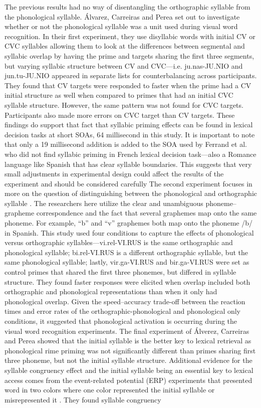 \documentclass[
12pt, %
english, %
doublespacing, %
nolistspacing, %
liststotoc, %
headsepline, %
chapterinoneline, %
openany, %
]{DoctoralThesis}\usepackage[]{graphicx}\usepackage[]{color}
\begin{document}
The previous results had no way of disentangling the orthographic syllable from the phonological syllable. Álvarez, Carreiras and Perea \parencite*{Alvarez2004-nd} set out to investigate whether or not the phonological syllable was a unit used during visual word recognition. In their first experiment, they use disyllabic words with initial CV or CVC syllables allowing them to look at the differences between segmental and syllabic overlap by having the prime and targets sharing the first three segments, but varying syllabic structure between CV and CVC—i.e. ju.nas-JU.NIO and jun.tu-JU.NIO appeared in separate lists for counterbalancing across participants. They found that CV targets were responded to faster when the prime had a CV initial structure as well when compared to primes that had an initial CVC syllable structure. However, the same pattern was not found for CVC targets. Participants also made more errors on CVC target than CV targets. These findings do support that fact that syllabic priming effects can be found in lexical decision tasks at short SOAs, 64 millisecond in this study. It is important to note that only a 19 millisecond addition is added to the SOA used by Ferrand et al. \parencite*{Ferrand1996-vu} who did not find syllabic priming in French lexical decision task—also a Romance language like Spanish that has clear syllable boundaries. This suggests that very small adjustments in experimental design could affect the results of the experiment and should be considered carefully The second experiment focuses in more on the question of distinguishing between the phonological and orthographic syllable \parencite{Alvarez2004-nd}. The researchers here utilize the clear and unambiguous phoneme–grapheme correspondence and the fact that several graphemes map onto the same phoneme. For example, “b” and “v” graphemes both map onto the phoneme /b/ in Spanish. This study used four conditions to capture the effects of phonological versus orthographic syllables—vi.rel-VI.RUS is the same orthographic and phonological syllable; bi.rel-VI.RUS is a different orthographic syllable, but the same phonological syllable; lastly, vir.ga-VI.RUS and bir.ga-VI.RUS were set as control primes that shared the first three phonemes, but differed in syllable structure. They found faster responses were elicited when overlap included both orthographic and phonological representations than when it only had phonological overlap. Given the speed–accuracy trade-off between the reaction times and error rates of the orthographic-phonological and phonological only conditions, it suggested that phonological activation is occurring during the visual word recognition experiments. The final experiment of Álverez, Carreiras and Perea \parencite*{Alvarez2004-nd} showed that the initial syllable is the better key to lexical retrieval as phonological rime priming was not significantly different than primes sharing first three phoneme, but not the initial syllable structure. Additional evidence for the syllable congruency effect and the initial syllable being an essential key to lexical access comes from the event-related potential (ERP) experiments that presented word in two colors where one color represented the initial syllable or misrepresented it \citep{Carreiras2005-us}. They found syllable congruency 
\end{document}
